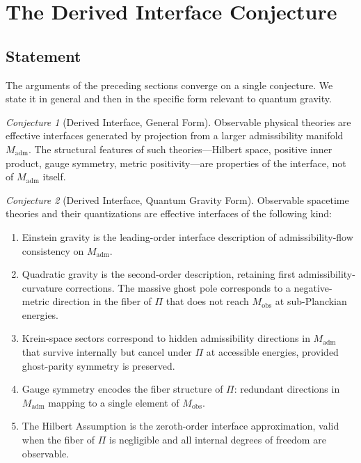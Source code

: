 \documentclass[12pt,a4paper]{article}
\theoremstyle{remark}
\newtheorem{conjecture}{Conjecture}[section]
\begin{document}
\section{The Derived Interface Conjecture}

\subsection{Statement}

The arguments of the preceding sections converge on a single conjecture.
We state it in general and then in the specific form relevant to quantum
gravity.

\begin{conjecture}[Derived Interface, General Form]
Observable physical theories are effective interfaces generated by
projection from a larger admissibility manifold $M_{\mathrm{adm}}$.
The structural features of such theories---Hilbert space, positive inner
product, gauge symmetry, metric positivity---are properties of the
interface, not of $M_{\mathrm{adm}}$ itself.
\end{conjecture}

\begin{conjecture}[Derived Interface, Quantum Gravity Form]
Observable spacetime theories and their quantizations are effective
interfaces of the following kind:
\begin{enumerate}[label=(\roman*)]
  \item Einstein gravity is the leading-order interface description of
        admissibility-flow consistency on $M_{\mathrm{adm}}$.
  \item Quadratic gravity is the second-order description, retaining
        first admissibility-curvature corrections. The massive ghost pole
        corresponds to a negative-metric direction in the fiber of $\Pi$
        that does not reach $M_{\mathrm{obs}}$ at sub-Planckian energies.
  \item Krein-space sectors correspond to hidden admissibility directions
        in $M_{\mathrm{adm}}$ that survive internally but cancel under $\Pi$
        at accessible energies, provided ghost-parity symmetry is preserved.
  \item Gauge symmetry encodes the fiber structure of $\Pi$: redundant
        directions in $M_{\mathrm{adm}}$ mapping to a single element of
        $M_{\mathrm{obs}}$.
  \item The Hilbert Assumption is the zeroth-order interface approximation,
        valid when the fiber of $\Pi$ is negligible and all internal degrees
        of freedom are observable.
\end{enumerate}
\end{conjecture}
\end{document}
